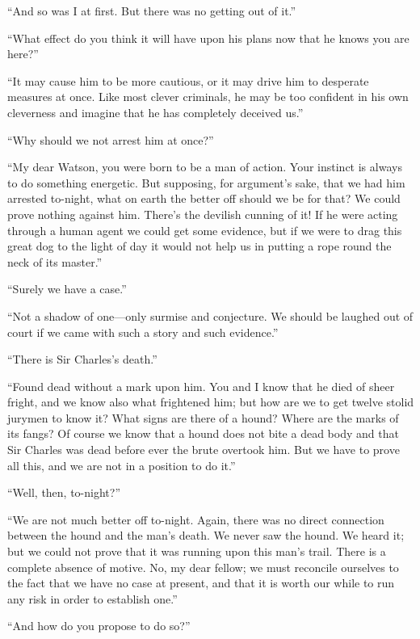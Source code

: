 \documentclass[paper=5.5in:8.5in,BCOR=7mm,twoside,DIV=calc,12pt,usegeometry,openany,chapterprefix,endperiod]{scrbook} %
\begin{document}
\enquote{And so was I at first. But there was no getting out of it.}

\enquote{What effect do you think it will have upon his plans now that he knows you are here?}

\enquote{It may cause him to be more cautious, or it may drive him to desperate measures at once. Like most clever criminals, he may be too confident in his own cleverness and imagine that he has completely deceived us.}

\enquote{Why should we not arrest him at once?}

\enquote{My dear Watson, you were born to be a man of action. Your instinct is always to do something energetic. But supposing, for argument's sake, that we had him arrested to-night, what on earth the better off should we be for that? We could prove nothing against him. There's the devilish cunning of it! If he were acting through a human agent we could get some evidence, but if we were to drag this great dog to the light of day it would not help us in putting a rope round the neck of its master.}

\enquote{Surely we have a case.}

\enquote{Not a shadow of one\nobreakdash---only surmise and conjecture. We should be laughed out of court if we came with such a story and such evidence.}

\enquote{There is Sir Charles's death.}

\enquote{Found dead without a mark upon him. You and I know that he died of sheer fright, and we know also what frightened him; but how are we to get twelve stolid jurymen to know it? What signs are there of a hound? Where are the marks of its fangs? Of course we know that a hound does not bite a dead body and that Sir Charles was dead before ever the brute overtook him. But we have to prove all this, and we are not in a position to do it.}

\enquote{Well, then, to-night?}

\enquote{We are not much better off to-night. Again, there was no direct connection between the hound and the man's death. We never saw the hound. We heard it; but we could not prove that it was running upon this man's trail. There is a complete absence of motive. No, my dear fellow; we must reconcile ourselves to the fact that we have no case at present, and that it is worth our while to run any risk in order to establish one.}

\enquote{And how do you propose to do so?}
\end{document}
